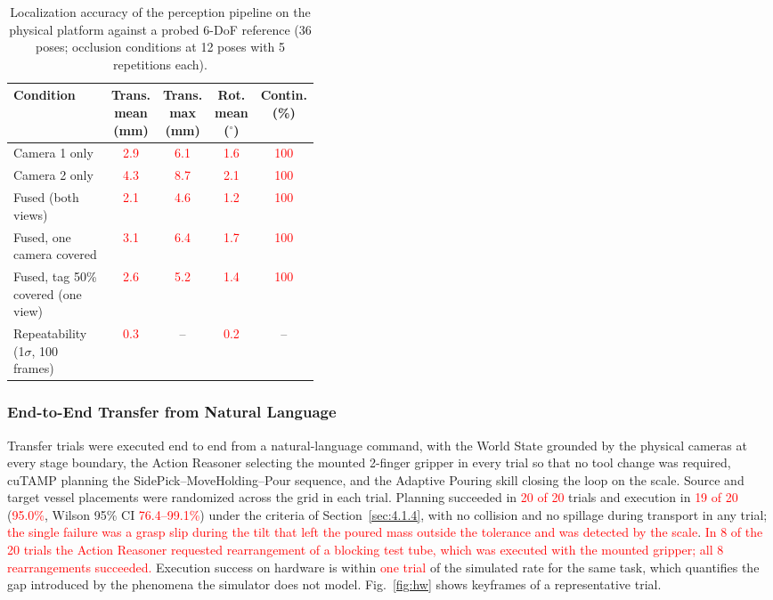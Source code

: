 \documentclass{ieeeaccess}
\newif\ifhighlight
\newcommand{\rev}[1]{\ifhighlight\hl{#1}\else#1\fi}
\newcommand{\nd}[1]{\textcolor{red}{#1}}
\newcommand{\revbox}[1]{\ifhighlight\noindent\colorbox{yellow}{\parbox{\dimexpr\linewidth-2\fboxsep\relax}{#1}}\else#1\fi}
\begin{document}
\begin{table}[t]
\revbox{%
\centering
\caption{Localization accuracy of the perception pipeline on the physical platform against a probed 6-DoF reference (36 poses; occlusion conditions at 12 poses with 5 repetitions each).}\label{tab:perception}
\scriptsize
\setlength{\tabcolsep}{2pt}
\begin{tabular*}{\linewidth}{@{\extracolsep{\fill}}p{0.4\linewidth}cccc@{}}
\toprule
Condition & \makecell{Trans.\\mean (mm)} & \makecell{Trans.\\max (mm)} & \makecell{Rot.\\mean ($^\circ$)} & \makecell{Contin.\\(\%)} \\
\midrule
Camera 1 only & \nd{2.9} & \nd{6.1} & \nd{1.6} & \nd{100} \\
Camera 2 only & \nd{4.3} & \nd{8.7} & \nd{2.1} & \nd{100} \\
Fused (both views) & \nd{2.1} & \nd{4.6} & \nd{1.2} & \nd{100} \\
Fused, one camera covered & \nd{3.1} & \nd{6.4} & \nd{1.7} & \nd{100} \\
Fused, tag 50\% covered (one view) & \nd{2.6} & \nd{5.2} & \nd{1.4} & \nd{100} \\
Repeatability (1$\sigma$, 100 frames) & \nd{0.3} & -- & \nd{0.2} & -- \\
\bottomrule
\end{tabular*}}
\end{table}

\subsubsection{End-to-End Transfer from Natural Language}\label{sec:4.6.2}
\rev{ Transfer trials were executed end to end from a natural-language command, with the World State grounded by the physical cameras at every stage boundary, the Action Reasoner selecting the mounted 2-finger gripper in every trial so that no tool change was required, cuTAMP planning the SidePick--MoveHolding--Pour sequence, and the Adaptive Pouring skill closing the loop on the scale.
Source and target vessel placements were randomized across the grid in each trial.
Planning succeeded in \nd{20 of 20} trials and execution in \nd{19 of 20} (\nd{95.0\%}, Wilson 95\% CI \nd{76.4--99.1\%}) under the criteria of Section~\ref{sec:4.1.4}, with no collision and no spillage during transport in any trial; \nd{the single failure was a grasp slip during the tilt that left the poured mass outside the tolerance and was detected by the scale}.
\nd{In 8 of the 20 trials the Action Reasoner requested rearrangement of a blocking test tube, which was executed with the mounted gripper; all 8 rearrangements succeeded.}
Execution success on hardware is within \nd{one trial} of the simulated rate for the same task, which quantifies the gap introduced by the phenomena the simulator does not model.
Fig.~\ref{fig:hw} shows keyframes of a representative trial.}
\end{document}
